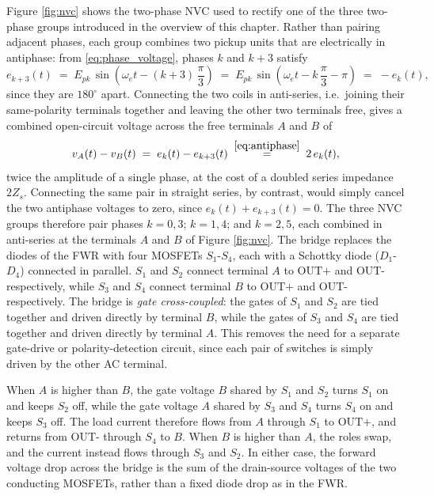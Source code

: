 Figure \ref{fig:nvc} shows the two-phase NVC used to rectify one of the three two-phase groups introduced in the overview of this chapter. Rather than pairing adjacent phases, each group combines two pickup units that are electrically in antiphase: from \eqref{eq:phase_voltage}, phases $k$ and $k+3$ satisfy
\begin{equation}
    e_{k+3}(t) \;=\; E_{pk}\,\sin\!\left(\omega_e t - (k+3)\,\frac{\pi}{3}\right) \;=\; E_{pk}\,\sin\!\left(\omega_e t - k\,\frac{\pi}{3} - \pi\right) \;=\; -e_k(t),
    \label{eq:antiphase}
\end{equation}
since they are $180^\circ$ apart. Connecting the two coils in anti-series, i.e.\ joining their same-polarity terminals together and leaving the other two terminals free, gives a combined open-circuit voltage across the free terminals $A$ and $B$ of
\begin{equation}
    v_A(t) - v_B(t) \;=\; e_k(t) - e_{k+3}(t) \;\overset{\eqref{eq:antiphase}}{=}\; 2\,e_k(t),
    \label{eq:antiseries}
\end{equation}
twice the amplitude of a single phase, at the cost of a doubled series impedance $2Z_s$. Connecting the same pair in straight series, by contrast, would simply cancel the two antiphase voltages to zero, since $e_k(t)+e_{k+3}(t)=0$. The three NVC groups therefore pair phases $k=0,3$; $k=1,4$; and $k=2,5$, each combined in anti-series at the terminals $A$ and $B$ of Figure \ref{fig:nvc}. The bridge replaces the diodes of the FWR with four MOSFETs $S_1$-$S_4$, each with a Schottky diode ($D_1$-$D_4$) connected in parallel. $S_1$ and $S_2$ connect terminal $A$ to $\text{OUT+}$ and $\text{OUT-}$ respectively, while $S_3$ and $S_4$ connect terminal $B$ to $\text{OUT+}$ and $\text{OUT-}$ respectively. The bridge is \emph{gate cross-coupled}: the gates of $S_1$ and $S_2$ are tied together and driven directly by terminal $B$, while the gates of $S_3$ and $S_4$ are tied together and driven directly by terminal $A$. This removes the need for a separate gate-drive or polarity-detection circuit, since each pair of switches is simply driven by the other AC terminal.

When $A$ is higher than $B$, the gate voltage $B$ shared by $S_1$ and $S_2$ turns $S_1$ on and keeps $S_2$ off, while the gate voltage $A$ shared by $S_3$ and $S_4$ turns $S_4$ on and keeps $S_3$ off. The load current therefore flows from $A$ through $S_1$ to $\text{OUT+}$, and returns from $\text{OUT-}$ through $S_4$ to $B$. When $B$ is higher than $A$, the roles swap, and the current instead flows through $S_3$ and $S_2$. In either case, the forward voltage drop across the bridge is the sum of the drain-source voltages of the two conducting MOSFETs, rather than a fixed diode drop as in the FWR.

